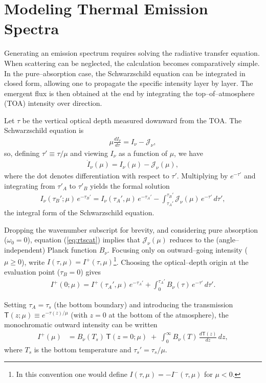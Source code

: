 \section{Modeling Thermal Emission Spectra}

Generating an emission spectrum requires solving the radiative transfer equation. When scattering can be neglected, the calculation becomes comparatively simple. In the pure–absorption case, the Schwarzschild equation can be integrated in closed form, allowing one to propagate the specific intensity layer by layer. The emergent flux is then obtained at the end by integrating the top–of–atmosphere (TOA) intensity over direction.

Let $\tau$ be the vertical optical depth measured downward from the TOA. The Schwarzschild equation is
\begin{align}
    \mu \frac{d I_\nu}{d \tau} = I_\nu - \mathcal{J}_\nu ,
\end{align}
so, defining $\tau' \equiv \tau/\mu$ and viewing $I_\nu$ as a function of $\mu$, we have
\begin{align}
    \dot{I}_\nu(\mu) = I_\nu(\mu) - \mathcal{J}_\nu(\mu),
\end{align}
where the dot denotes differentiation with respect to $\tau'$. Multiplying by $e^{-\tau'}$ and integrating from $\tau'_A$ to $\tau'_B$ yields the formal solution
\begin{align}
     I_\nu (\tau_B'; \mu) \, e^{-\tau_B'} = I_\nu (\tau_A', \mu) \, e^{-\tau_A'} - \int_{\tau_A'}^{\tau_B'} \mathcal{J}_\nu(\mu) \, e^{-\tau'} \, d\tau' ,
\end{align}
the integral form of the Schwarzschild equation.

Dropping the wavenumber subscript for brevity, and considering pure absorption ($\omega_0=0$), equation (\ref{eq:rtscat}) implies that $\mathcal{J}_\nu(\mu)$ reduces to the (angle–independent) Planck function $B_\nu$. Focusing only on outward–going intensity ($\mu \ge 0$), write $I(\tau,\mu)=I^+(\tau,\mu)$\footnote{In this convention one would define $I(\tau,\mu)=-I^-(\tau,\mu)$ for $\mu<0$.}. Choosing the optical–depth origin at the evaluation point ($\tau_B=0$) gives
\begin{align}
\label{eq:intensity_transfer}
I^+(0;\mu) = I^+(\tau_A',\mu) \, e^{-\tau_A'} + \int_{0}^{\tau_A'} B_\nu(\tau)\, e^{-\tau'} \, d\tau' .
\end{align}

Setting $\tau_A=\tau_s$ (the bottom boundary) and introducing the transmission
$\mathsf{T}(z;\mu) \equiv e^{-\tau(z)/\mu}$ (with $z=0$ at the bottom of the atmosphere), the monochromatic outward intensity can be written
\begin{align}
    I^+(\mu) &= B_\nu(T_s)\, \mathsf{T}(z=0;\mu) \;+\; \int_{0}^{\infty} B_\nu(T)\, \frac{d\mathsf{T}(z)}{dz}\, dz ,
\end{align}
where $T_s$ is the bottom temperature and $\tau_s'=\tau_s/\mu$.

